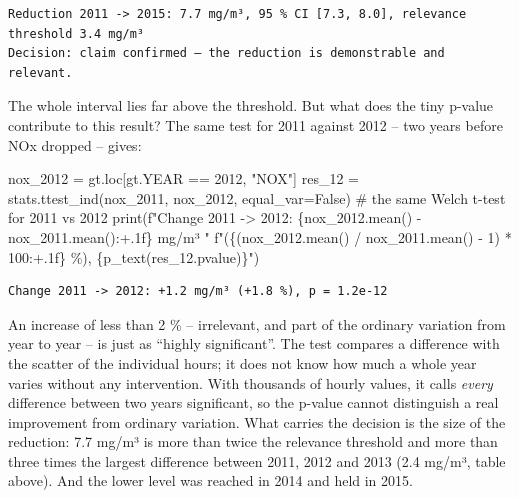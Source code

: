 \documentclass[
  letterpaper,
  DIV=11,
  numbers=noendperiod]{scrreprt}
\newenvironment{Shaded}{\begin{snugshade}}{\end{snugshade}}
\newcommand{\BuiltInTok}[1]{\textcolor[rgb]{0.00,0.23,0.31}{#1}}
\newcommand{\CommentTok}[1]{\textcolor[rgb]{0.37,0.37,0.37}{#1}}
\newcommand{\DecValTok}[1]{\textcolor[rgb]{0.68,0.00,0.00}{#1}}
\newcommand{\NormalTok}[1]{\textcolor[rgb]{0.00,0.23,0.31}{#1}}
\newcommand{\OperatorTok}[1]{\textcolor[rgb]{0.37,0.37,0.37}{#1}}
\newcommand{\SpecialCharTok}[1]{\textcolor[rgb]{0.37,0.37,0.37}{#1}}
\newcommand{\SpecialStringTok}[1]{\textcolor[rgb]{0.13,0.47,0.30}{#1}}
\newcommand{\StringTok}[1]{\textcolor[rgb]{0.13,0.47,0.30}{#1}}
\newcommand{\VariableTok}[1]{\textcolor[rgb]{0.07,0.07,0.07}{#1}}
\begin{document}
\begin{verbatim}
Reduction 2011 -> 2015: 7.7 mg/m³, 95 % CI [7.3, 8.0], relevance threshold 3.4 mg/m³
Decision: claim confirmed – the reduction is demonstrable and relevant.
\end{verbatim}

The whole interval lies far above the threshold. But what does the tiny
p-value contribute to this result? The same test for 2011 against 2012
-- two years before NOx dropped -- gives:

\begin{Shaded}
\begin{Highlighting}[]
\NormalTok{nox\_2012 }\OperatorTok{=}\NormalTok{ gt.loc[gt.YEAR }\OperatorTok{==} \DecValTok{2012}\NormalTok{, }\StringTok{"NOX"}\NormalTok{]}
\NormalTok{res\_12 }\OperatorTok{=}\NormalTok{ stats.ttest\_ind(nox\_2011, nox\_2012, equal\_var}\OperatorTok{=}\VariableTok{False}\NormalTok{)  }\CommentTok{\# the same Welch t{-}test for 2011 vs 2012}
\BuiltInTok{print}\NormalTok{(}\SpecialStringTok{f"Change 2011 {-}\textgreater{} 2012: }\SpecialCharTok{\{}\NormalTok{nox\_2012}\SpecialCharTok{.}\NormalTok{mean() }\OperatorTok{{-}}\NormalTok{ nox\_2011}\SpecialCharTok{.}\NormalTok{mean()}\SpecialCharTok{:+.1f\}}\SpecialStringTok{ mg/m³ "}
      \SpecialStringTok{f"(}\SpecialCharTok{\{}\NormalTok{(nox\_2012.mean() }\OperatorTok{/}\NormalTok{ nox\_2011.mean() }\OperatorTok{{-}} \DecValTok{1}\NormalTok{) }\OperatorTok{*} \DecValTok{100}\SpecialCharTok{:+.1f\}}\SpecialStringTok{ \%), }\SpecialCharTok{\{}\NormalTok{p\_text(res\_12.pvalue)}\SpecialCharTok{\}}\SpecialStringTok{"}\NormalTok{)}
\end{Highlighting}
\end{Shaded}

\begin{verbatim}
Change 2011 -> 2012: +1.2 mg/m³ (+1.8 %), p = 1.2e-12
\end{verbatim}

An increase of less than 2 \% -- irrelevant, and part of the ordinary
variation from year to year -- is just as ``highly significant''. The
test compares a difference with the scatter of the individual hours; it
does not know how much a whole year varies without any intervention.
With thousands of hourly values, it calls \emph{every} difference
between two years significant, so the p-value cannot distinguish a real
improvement from ordinary variation. What carries the decision is the
size of the reduction: 7.7 mg/m³ is more than twice the relevance
threshold and more than three times the largest difference between 2011,
2012 and 2013 (2.4 mg/m³, table above). And the lower level was reached
in 2014 and held in 2015.
\end{document}
